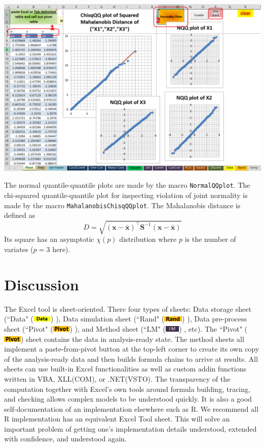\documentclass[article]{jss}
\newcommand{\shtData}{``Data" (\includegraphics[height=8pt, keepaspectratio=true]{DataSheetTab_png}) }
\newcommand{\shtRand}{``Rand" (\includegraphics[height=8pt, keepaspectratio=true]{RandSheetTab_png}) }
\newcommand{\shtPivot}{``Pivot" (\includegraphics[height=8pt, keepaspectratio=true]{PivotSheetTab_png}) }
\newcommand{\shtLM}{``LM" (\includegraphics[height=8pt, keepaspectratio=true]{LMSheetTab_png}) }
\begin{document}
\begin{enumerate}
        \begin{center}
        \includegraphics[width=\linewidth, keepaspectratio=true]{PivotSheetNormalityPlots_png}
        \end{center}
        The normal quantile-quantile plots are made by the  macro \texttt{NormalQQplot}. The chi-squared quantile-quantile plot for inspecting violation of joint normality is made by the macro \texttt{MahalanobisChisqQQplot}. The Mahalanobis distance is defined as \[D = \sqrt {{{\left( {\textbf{x} - \bar{\textbf{x}}} \right)}^ \intercal }{\textbf{S}^{ - 1}}\left( {\textbf{x} - \bar{\textbf{x}}} \right)} \]
        Its square has an asymptotic $\chi(p)$ distribution where $p$ is the number of variates ($p=3$ here).
        \end{enumerate}
        
        
        
        \section[software]{Discussion}
        The Excel tool is sheet-oriented. There four types of sheets: Data storage sheet (\shtData), Data simulation sheet (\shtRand), Data pre-process sheet (\shtPivot), and Method sheet (\shtLM, etc). The \shtPivot sheet contains the data in analysis-ready state. The method sheets all implement a paste-from-pivot button at the top-left corner to create its own copy of the analysis-ready data and then builds formula chains to arrive at results. All sheets can use built-in Excel functionalities as well as custom addin functions written in VBA, XLL(COM), or .NET(VSTO). The transparency of the computation together with Excel's own tools around formula building, tracing, and checking allows complex models to be understood quickly. It is also a good self-documentation of an implementation elsewhere such as R. We recommend all R implementation has an equivalent Excel Tool sheet. This will solve an important problem of getting one's implementation details understood, extended with confidence, and understood again.
        
        
        
\end{document}
